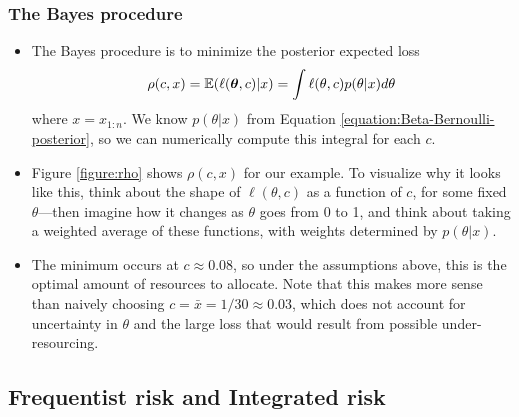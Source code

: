 \documentclass[12pt]{article}
\begin{document}
\subsubsection*{The Bayes procedure}
\begin{itemize}
\item The Bayes procedure is to minimize the posterior expected loss
$$\rho(c,x) =\mathbb{E}(\ell({\bm\theta},c)|x) = \int \ell(\theta,c)p(\theta|x)d\theta $$
where $x = x_{1:n}$. We know $p(\theta|x)$ from Equation \ref{equation:Beta-Bernoulli-posterior}, so we can numerically compute this integral for each $c$.
\item Figure \ref{figure:rho} shows $\rho(c,x)$ for our example. To visualize why it looks like this, think about the shape of $\ell(\theta,c)$ as a function of $c$, for some fixed $\theta$---then imagine how it changes as $\theta$ goes from 0 to 1, and think about taking a weighted average of these functions, with weights determined by $p(\theta|x)$.
\item The minimum occurs at $c\approx 0.08$, so under the
    assumptions above, this is the optimal amount of resources to allocate. Note that this makes more sense than naively
    choosing $c=\bar x=1/30 \approx 0.03$, which does not account for uncertainty in $\theta$ and
    the large loss that would result from possible under-resourcing.
\end{itemize}





\subsection{Frequentist risk and Integrated risk}
\end{document}
